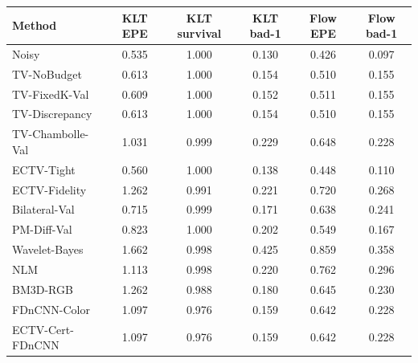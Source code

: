 \begin{tabular}{lccccc}
\toprule
Method & KLT EPE & KLT survival & KLT bad-1 & Flow EPE & Flow bad-1 \\
\midrule
Noisy & 0.535 & 1.000 & 0.130 & 0.426 & 0.097 \\
TV-NoBudget & 0.613 & 1.000 & 0.154 & 0.510 & 0.155 \\
TV-FixedK-Val & 0.609 & 1.000 & 0.152 & 0.511 & 0.155 \\
TV-Discrepancy & 0.613 & 1.000 & 0.154 & 0.510 & 0.155 \\
TV-Chambolle-Val & 1.031 & 0.999 & 0.229 & 0.648 & 0.228 \\
ECTV-Tight & 0.560 & 1.000 & 0.138 & 0.448 & 0.110 \\
ECTV-Fidelity & 1.262 & 0.991 & 0.221 & 0.720 & 0.268 \\
Bilateral-Val & 0.715 & 0.999 & 0.171 & 0.638 & 0.241 \\
PM-Diff-Val & 0.823 & 1.000 & 0.202 & 0.549 & 0.167 \\
Wavelet-Bayes & 1.662 & 0.998 & 0.425 & 0.859 & 0.358 \\
NLM & 1.113 & 0.998 & 0.220 & 0.762 & 0.296 \\
BM3D-RGB & 1.262 & 0.988 & 0.180 & 0.645 & 0.230 \\
FDnCNN-Color & 1.097 & 0.976 & 0.159 & 0.642 & 0.228 \\
ECTV-Cert-FDnCNN & 1.097 & 0.976 & 0.159 & 0.642 & 0.228 \\
\bottomrule
\end{tabular}

